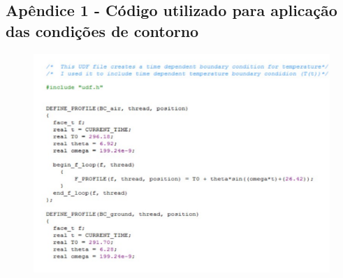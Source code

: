 \documentclass[a4paper,12pt,oneside]{article}
\numberwithin{equation}{section}
\begin{document}
\subsection{Apêndice 1 - Código utilizado para aplicação das condições de contorno}

\begin{figure}[h]
\centering
\includegraphics[width=1\linewidth]{img/codigo}
\end{figure}
\end{document}
